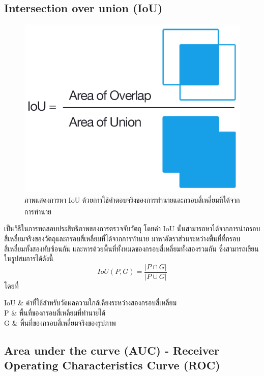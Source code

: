 \subsection*{Intersection over union (IoU)}
\begin{figure}[!ht]
	\centering
	\includegraphics[scale=0.3]{chapter2/images/iou_equation.png}
		\caption[ภาพแสดงการหา IoU ด้วยการใช้คำตอบจริงของการทำนายและกรอบสี่เหลี่ยมที่ได้จากการทำนาย]{ภาพแสดงการหา IoU ด้วยการใช้คำตอบจริงของการทำนายและกรอบสี่เหลี่ยมที่ได้จากการทำนาย\textsuperscript{\cite{iou_pic}}}
    	\label{fig:iou_equation}
\end{figure}
เป็นวิธีในการทดสอบประสิทธิภาพของการตรวจจับวัตถุ โดยค่า IoU นั้นสามารถหาได้จากการนำกรอบสี่เหลี่ยมจริงของวัตถุและกรอบสี่เหลี่ยมที่ได้จากการทำนาย
มาหาอัตราส่วนระหว่างพื้นที่ที่กรอบสี่เหลี่ยมทั้งสองทับซ้อนกัน และหารด้วยพื้นที่ทั้งหมดของกรอบสี่เหลี่ยมทั้งสองรวมกัน ซึ่งสามารถเขียนในรูปสมการได้ดังนี้
\begin{equation}
IoU(P,G) = \frac{\left| P \cap G \right|}{\left| P \cup  G \right|}					
\end{equation}
โดยที่
\begin{conditions}
IoU			&  ค่าที่ใช้สำหรับวัดผลความใกล้เคียงระหว่างสองกรอบสี่เหลี่ยม    \\
P			&  พื้นที่ของกรอบสี่เหลี่ยมที่ทำนายได้	\\
G			&  พื้นที่ของกรอบสี่เหลี่ยมจริงของรูปภาพ					\\
\end{conditions}

\subsection*{Area under the curve (AUC) - Receiver Operating Characteristics Curve (ROC)}


